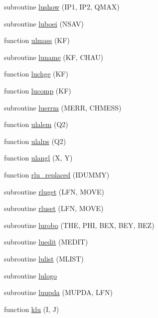 \begin{DoxyCompactItemize}
\item 
subroutine \hyperlink{jetset7409_8f_a0bdbe298274d1bf15e7098046b96239e}{lushow} (I\+P1, I\+P2, Q\+M\+AX)
\item 
subroutine \hyperlink{jetset7409_8f_a762ad9eeab644f704f5de8395bd89997}{luboei} (N\+S\+AV)
\item 
function \hyperlink{jetset7409_8f_aa951cb677600842104db95323a7647b2}{ulmass} (KF)
\item 
subroutine \hyperlink{jetset7409_8f_a87cfaa02a00bc60d5b1ce6c2fce29432}{luname} (KF, C\+H\+AU)
\item 
function \hyperlink{jetset7409_8f_a86938fb3242850e133e3b60d256582b7}{luchge} (KF)
\item 
function \hyperlink{jetset7409_8f_af4e2c29d51aeb470efbf59be26e18d04}{lucomp} (KF)
\item 
subroutine \hyperlink{jetset7409_8f_ab2b89149ed6c532c613c12ae6c351b5d}{luerrm} (M\+E\+RR, C\+H\+M\+E\+SS)
\item 
function \hyperlink{jetset7409_8f_a59f4ea713816e8bcd665aef916e6bad7}{ulalem} (Q2)
\item 
function \hyperlink{jetset7409_8f_ab97912b68e33a5152f0271fc0dbc311d}{ulalps} (Q2)
\item 
function \hyperlink{jetset7409_8f_a13a8d5a72aa20b0ae2ceca14e31467ba}{ulangl} (X, Y)
\item 
function \hyperlink{jetset7409_8f_a4758ce80e3e68c1512788bab3abe9a0c}{rlu\+\_\+replaced} (I\+D\+U\+M\+MY)
\item 
subroutine \hyperlink{jetset7409_8f_aea3b04f21086e3eea89983ad08de76ac}{rluget} (L\+FN, M\+O\+VE)
\item 
subroutine \hyperlink{jetset7409_8f_aae19dd29cb0444e2034b7e94409bb8ed}{rluset} (L\+FN, M\+O\+VE)
\item 
subroutine \hyperlink{jetset7409_8f_acd0c9860f321d2221dd01a05b17a6bac}{lurobo} (T\+HE, P\+HI, B\+EX, B\+EY, B\+EZ)
\item 
subroutine \hyperlink{jetset7409_8f_aaacc14ce32bf7ae36ea919afd5d45016}{luedit} (M\+E\+D\+IT)
\item 
subroutine \hyperlink{jetset7409_8f_a69a9c5efe2681d7e19be2b4ed218153e}{lulist} (M\+L\+I\+ST)
\item 
subroutine \hyperlink{jetset7409_8f_a9ede0e99adc856022ecf52cc85bde51c}{lulogo}
\item 
subroutine \hyperlink{jetset7409_8f_aff638e1a64b19f0b205bf2672a4d154e}{luupda} (M\+U\+P\+DA, L\+FN)
\item 
function \hyperlink{jetset7409_8f_add1daceddb712a91ab2f9901ae80692f}{klu} (I, J)

\end{DoxyCompactItemize}
